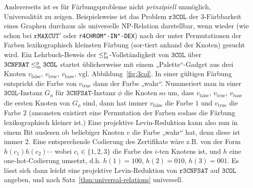 Andererseits ist es für Färbungsprobleme nicht \emph{prinzipiell} unmöglich, Universalität zu zeigen. Beispielsweise ist das Problem $\mathtt{r3COL}$ der 3-Färbbarkeit eines Graphen durchaus als universelle NP-Relation darstellbar, wenn wieder (wie schon bei $\mathtt{rMAXCUT}'$ oder \texttt{r4CHROM"-IN"-DEX}) nach der unter Permutationen der Farben lexikographisch kleinsten Färbung (sor-\linebreak{}tiert anhand der Knoten) gesucht wird.
Ein Lehrbuch-Beweis der $\leq_\mathrm{m}^\mathrm{p}$-Vollständigkeit von $\mathtt{3COL}$ über $\mathtt{3CNFSAT}\leq_\mathrm{m}^\mathrm{p}\mathtt{3COL}$ startet üblicherweise mit einem „Palette“-Gadget aus drei Knoten $v_{\text{false}}$, $ v_{\text{true}}$, $ v_{\text{base}}$, vgl. Abbildung~\ref{fig:3col}. In einer gültigen Färbung entspricht die Farbe von $v_{\text{true}}$ dann der Farbe „wahr“. Nummeriert man in einer $\mathtt{3COL}$-Instanz $G_\phi$ für $\mathtt{3CNFSAT}$-Instanz $\phi$ die Knoten  so  um, dass $v_{\text{false}}$, $ v_{\text{true}}$, $ v_{\text{base}}$ die ersten Knoten von $G_\phi$ sind, dann hat immer $v_{\text{false}}$ die Farbe $1$ und $v_{\text{true}}$ die Farbe $2$ (ansonsten existiert eine Permutation der Farben sodass die Färbung lexikographisch kleiner ist.)
Eine projektive Levin-Reduktion kann also nun in einem Bit auslesen ob beliebiger Knoten $v$ die Farbe „wahr“ hat, denn diese ist immer $2$.
Eine entsprechende Codierung des Zertifikats wäre z.B. von der Form $h(c_1)h(c_2)\cdots$ wobei $c_i\in\{1,2,3\}$ die Farbe des $i$-ten Knotens ist, und $h$ eine one-hot-Codierung umsetzt, d.h. $h(1)=100$, $h(2)=010$, $h(3)=001$. Es lässt sich dann leicht eine projektive Levin-Reduktion von $\mathtt{r3CNFSAT}$ auf $\mathtt{3COL}$ angeben, und nach Satz~\ref{thm:universal-relations} universell.

